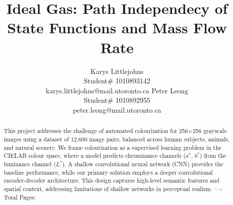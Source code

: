 \documentclass{article} %
\title{Ideal Gas: Path Independecy of  \\
State Functions and Mass Flow Rate}
\author{Karys Littlejohns\\
Student\# 1010893142 \\
karys.littlejohns@mail.utoronto.ca
\And
Peter Leong \\
Student\# 1010892955 \\
peter.leong@mail.utoronto.ca 
}
\begin{document}
\maketitle

\vspace{-3ex}

\begin{abstract}
This project addresses the challenge of automated colourization for 256$\times$256 grayscale images using a dataset of 12,600 image pairs, balanced across human subjects, 
animals, and natural scenery. We frame colourization as a supervised learning problem in the CIELAB colour space, where a model predicts chrominance channels ($a^*$, $b^*$) 
from the luminance channel ($L^*$). A shallow convolutional neural network (CNN) provides the baseline performance, while our primary solution employs a deeper convolutional 
encoder-decoder architecture. This design captures high-level semantic features and spatial context, addressing limitations of shallow networks in perceptual realism.
----Total Pages: \pageref{last_page}
\end{abstract}

\vspace{2ex}
\end{document}
